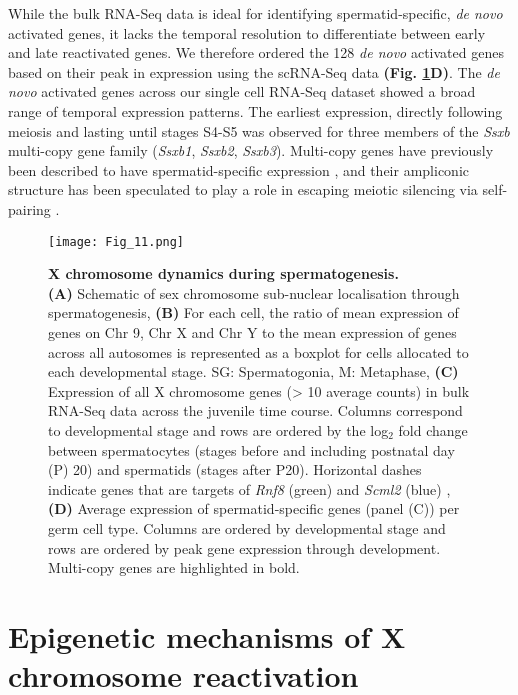While the bulk RNA-Seq data is ideal for identifying spermatid-specific, \emph{de novo} activated genes, it lacks the temporal resolution to differentiate between early and late reactivated genes. We therefore ordered the 128 \emph{de novo} activated genes based on their peak in expression using the scRNA-Seq data \textbf{(Fig. \ref{fig3:X_reactivation}D)}. The \emph{de novo} activated genes across our single cell RNA-Seq dataset showed a broad range of temporal expression patterns. The earliest expression, directly following meiosis and lasting until stages S4-S5 was observed for three members of the \textit{Ssxb} multi-copy gene family (\textit{Ssxb1}, \textit{Ssxb2}, \textit{Ssxb3}). Multi-copy genes have previously been described to have spermatid-specific expression \citep{Mueller2008}, and their ampliconic structure has been speculated to play a role in escaping meiotic silencing via self-pairing \citep{Disteche2008}.

\newpage

\begin{figure}[!h]
\centering
\texttt{[image: Fig\_11.png]}
\caption[X chromosome dynamics during spermatogenesis]{\textbf{X chromosome dynamics during spermatogenesis.} \\
\textbf{(A)} Schematic of sex chromosome sub-nuclear localisation through spermatogenesis, \textbf{(B)} For each cell, the ratio of mean expression of genes on Chr 9, Chr X and Chr Y to the mean expression of genes across all autosomes is represented as a boxplot for cells allocated to each developmental stage. SG: Spermatogonia, M: Metaphase, \textbf{(C)} Expression of all X chromosome genes (> 10 average counts) in bulk RNA-Seq data across the juvenile time course. Columns correspond to developmental stage and rows are ordered by the log$_2$ fold change between spermatocytes (stages before and including postnatal day (P) 20) and spermatids (stages after P20). Horizontal dashes indicate genes that are targets of \textit{Rnf8} (green) and \textit{Scml2} (blue) \citep{Adams2018}, \textbf{(D)} Average expression of spermatid-specific genes (panel (C)) per germ cell type. Columns are ordered by developmental stage and rows are ordered by peak gene expression through development. Multi-copy genes are highlighted in bold.}
\label{fig3:X_reactivation}
\end{figure}

\newpage

\section{Epigenetic mechanisms of X chromosome reactivation}

